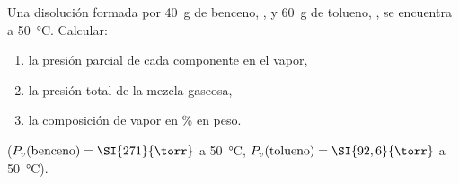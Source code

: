 Una disolución formada por \SI{40}{\gram} de benceno, , y \SI{60}{\gram} de tolueno, , se encuentra a \SI{50}{\celsius}. Calcular:
	\begin{enumerate}[label={\alph*)},font=\bfseries]
		\item la presión parcial de cada componente en el vapor,
		\item la presión total de la mezcla gaseosa,
		\item la composición de vapor en \% en peso.
	\end{enumerate}
	 ($P_v(\text{benceno}) = \SI{271}{\torr}$ a \SI{50}{\celsius}, $P_v(\text{tolueno}) = \SI{92,6}{\torr}$ a \SI{50}{\celsius}).

